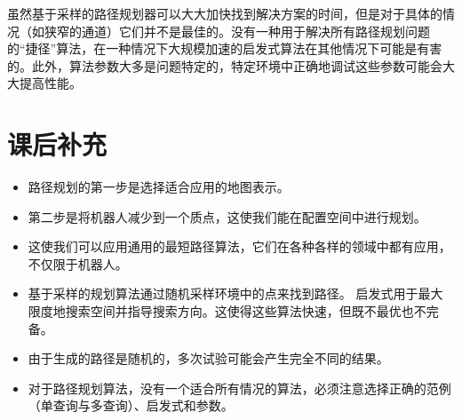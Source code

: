 虽然基于采样的路径规划器可以大大加快找到解决方案的时间，但是对于具体的情况（如狭窄的通道）它们并不是最佳的。没有一种用于解决所有路径规划问题的“捷径”算法，在一种情况下大规模加速的启发式算法在其他情况下可能是有害的。此外，算法参数大多是问题特定的，特定环境中正确地调试这些参数可能会大大提高性能。


\section*{课后补充}
\begin{itemize}

\item 路径规划的第一步是选择适合应用的地图表示。
\item 第二步是将机器人减少到一个质点，这使我们能在配置空间中进行规划。
\item 这使我们可以应用通用的最短路径算法，它们在各种各样的领域中都有应用，不仅限于机器人。
\item 基于采样的规划算法通过随机采样环境中的点来找到路径。 启发式用于最大限度地搜索空间并指导搜索方向。这使得这些算法快速，但既不最优也不完备。
\item 由于生成的路径是随机的，多次试验可能会产生完全不同的结果。
\item 对于路径规划算法，没有一个适合所有情况的算法，必须注意选择正确的范例（单查询与多查询）、启发式和参数。
\end{itemize}

